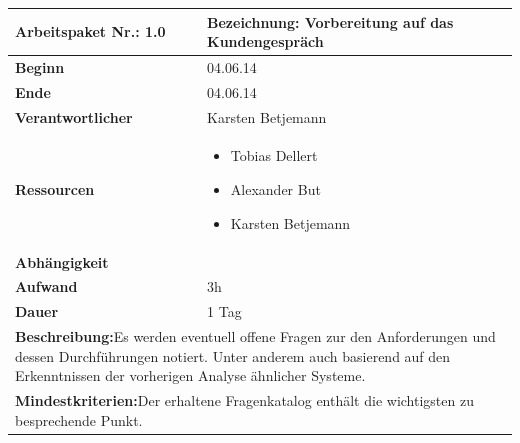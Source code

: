 \documentclass[fontsize=12pt,paper=a4,twoside]{scrartcl}
\begin{document}
	\begin{tabular}{|p{5.3cm}|p{9.7cm}|}\hline
		\textbf{Arbeitspaket Nr.:} 1.0 & \textbf{Bezeichnung:} Vorbereitung auf das Kundengespräch\\ \hline \hline
		\textbf{Beginn} & 04.06.14\\ \hline
		\textbf{Ende} & 04.06.14\\ \hline
		\textbf{Verantwortlicher} & Karsten Betjemann\\ \hline
		\textbf{Ressourcen} & \begin{itemize}
			\item Tobias Dellert
			\item Alexander But
			\item Karsten Betjemann
		\end{itemize}    \\ \hline
		\textbf{Abhängigkeit} &\\ \hline
		\textbf{Aufwand} & 3h\\ \hline
		\textbf{Dauer} & 1 Tag\\ \hline
		\multicolumn{2}{|p{15cm}|}{\textbf{Beschreibung:}\newline Es werden eventuell offene Fragen zur den Anforderungen und dessen Durchführungen notiert. Unter anderem auch  basierend auf den Erkenntnissen der vorherigen Analyse ähnlicher Systeme. }\\ \hline
		\multicolumn{2}{|p{15cm}|}{\textbf{Mindestkriterien:}\newline Der erhaltene Fragenkatalog enthält die wichtigsten zu besprechende Punkt. }\\ \hline
	\end{tabular}
	
	\begin{verbatim} 
	\end{verbatim}
	
\end{document}
